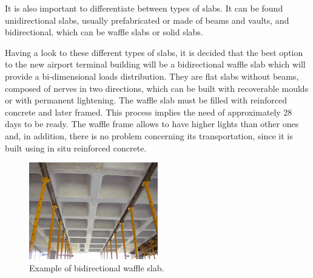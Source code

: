 It is also important to differentiate between types of slabs. It can be found unidirectional slabs, usually prefabricated or made of beams and vaults, and bidirectional, which can be waffle slabs or solid slabs.

Having a look to these different types of slabs, it is decided that the best option to the new airport terminal building will be a bidirectional waffle slab which will provide a bi-dimensional loads distribution. They are flat slabs without beams, composed of nerves in two directions, which can be built with recoverable moulds or with permanent lightening. The waffle slab must be filled with reinforced concrete and later framed. This process implies the need of approximately 28 days to be ready. The waffle frame allows to have higher lights than other ones and, in addition, there is no problem concerning its transportation, since it is built using in situ reinforced concrete.

\begin{figure}[H]
	\centering
	\includegraphics[clip, trim=0cm 0cm 0cm 0cm, width=0.5\textwidth]{./images/TipologiaEstructural/waffleslab}
	\caption{Example of bidirectional waffle slab.}
	\label{slab}
\end{figure}



	
